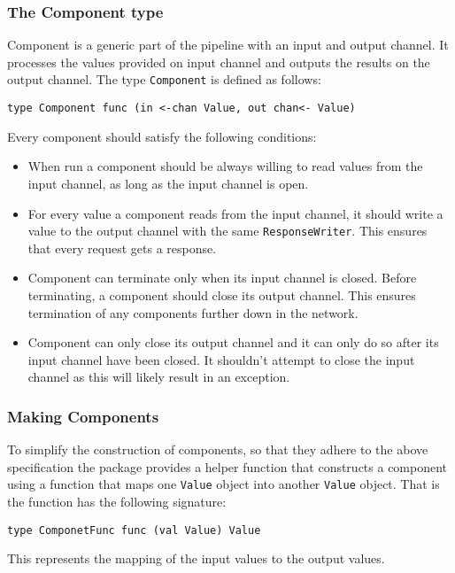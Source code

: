 \documentclass[12pt,a4paper]{article}
\begin{document}
\subsubsection{The Component type}
Component is a generic part of the pipeline with an input and output channel.
It processes the values provided on input channel and outputs the results
on the output channel. The type \texttt{Component} is defined as follows:
\begin{lstlisting}
type Component func (in <-chan Value, out chan<- Value)
\end{lstlisting}
Every component should satisfy the following conditions:
\begin{itemize}
    \item When run a component should be always willing to read values
          from the input channel, as long as the input channel is open.

    \item For every value a component reads from the input channel, 
          it should write a value to the output channel with the 
          same \texttt{ResponseWriter}. This ensures that every request 
          gets a response.

    \item Component can terminate only when its input channel is closed.
          Before terminating, a component should close its output channel.
          This ensures termination of any components further down in the network.

    \item Component can only close its output channel and it can only do so
    	  after its input channel have been closed. It shouldn't attempt
          to close the input channel as this will likely result in an exception.
\end{itemize}

\subsubsection{Making Components}
To simplify the construction of components, so that they adhere to 
the above specification the package provides a helper function that 
constructs a component using a function that maps one \texttt{Value} object 
into another \texttt{Value} object. 
That is the function has the following signature:
\begin{lstlisting}
type ComponetFunc func (val Value) Value
\end{lstlisting}
This represents the mapping of the input values to the output values. 
\end{document}
